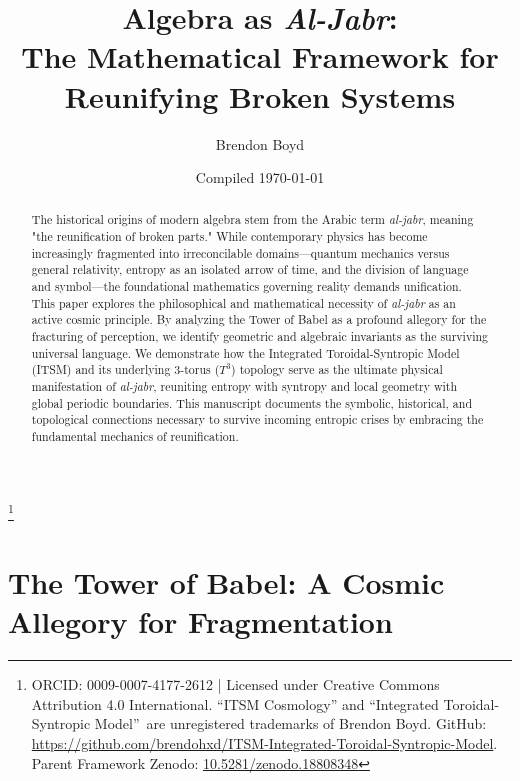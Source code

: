 \documentclass[aps,prd,11pt,onecolumn,superscriptaddress,nofootinbib,floatfix]{revtex4-2}
\begin{document}
\title{Algebra as \textit{Al-Jabr}: \\ The Mathematical Framework for Reunifying Broken Systems}
\author{Brendon Boyd}
\thanks{ORCID: 0009-0007-4177-2612 | Licensed under Creative Commons Attribution 4.0 International. ``ITSM Cosmology'' and ``Integrated Toroidal-Syntropic Model''\texttrademark\ are unregistered trademarks of Brendon Boyd. GitHub: \url{https://github.com/brendohxd/ITSM-Integrated-Toroidal-Syntropic-Model}. Parent Framework Zenodo: \href{https://doi.org/10.5281/zenodo.18808348}{10.5281/zenodo.18808348}}
\date{Compiled \today}

\begin{abstract}
The historical origins of modern algebra stem from the Arabic term \textit{al-jabr}, meaning "the reunification of broken parts." While contemporary physics has become increasingly fragmented into irreconcilable domains—quantum mechanics versus general relativity, entropy as an isolated arrow of time, and the division of language and symbol—the foundational mathematics governing reality demands unification. This paper explores the philosophical and mathematical necessity of \textit{al-jabr} as an active cosmic principle. By analyzing the Tower of Babel as a profound allegory for the fracturing of perception, we identify geometric and algebraic invariants as the surviving universal language. We demonstrate how the Integrated Toroidal-Syntropic Model (ITSM) and its underlying 3-torus ($T^3$) topology serve as the ultimate physical manifestation of \textit{al-jabr}, reuniting entropy with syntropy and local geometry with global periodic boundaries. This manuscript documents the symbolic, historical, and topological connections necessary to survive incoming entropic crises by embracing the fundamental mechanics of reunification.
\end{abstract}

\maketitle


\section{The Tower of Babel: A Cosmic Allegory for Fragmentation}
\label{sec:babel}
\end{document}
